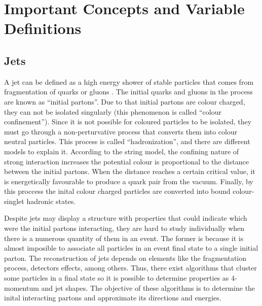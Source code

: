  \chapter{Important Concepts and Variable Definitions}
 \label{Important_concepts_chapter}
 
 \section{Jets}
 A jet can be defined as a high energy shower of stable particles that comes from fragmentation of quarks or gluons \cite{Particle_Detectors_Claus}. The initial quarks and gluons in the process are known as ``initial partons''. Due to that initial partons are colour charged, they can not be isolated singularly (this phenomenon is called ``colour confinement''). Since it is not possible for coloured particles to be isolated, they must go through a non-perturvative process that converts them into colour neutral particles. This process is called ``hadronization'', and there are different models to explain it. According to the string model, the confining nature of strong interaction increases the potential colour is proportional to the distance between the initial partons. When the distance reaches a certain critical value, it is energetically favourable to produce a quark pair from the vacuum. Finally, by this proccess the inital colour charged particles are converted into bound colour-singlet hadronic states.  
 
 Despite jets may display a structure with properties that could indicate which were the initial partons interacting, they are hard to study individually when there is a numerous quantity of them
 in an event. The former is because it is almost imposible to associate all particles in an event final state to a single initial parton. The reconstruction of jets depends on elements like the 
 fragmentation process, detectors effects, among others. Thus, there exist algorithms that cluster some particles in a final state so it is possible to determine properties as 4-momentum 
 and jet shapes. The objective of these algorithms is to determine the inital interacting partons and approximate its directions and energies.


